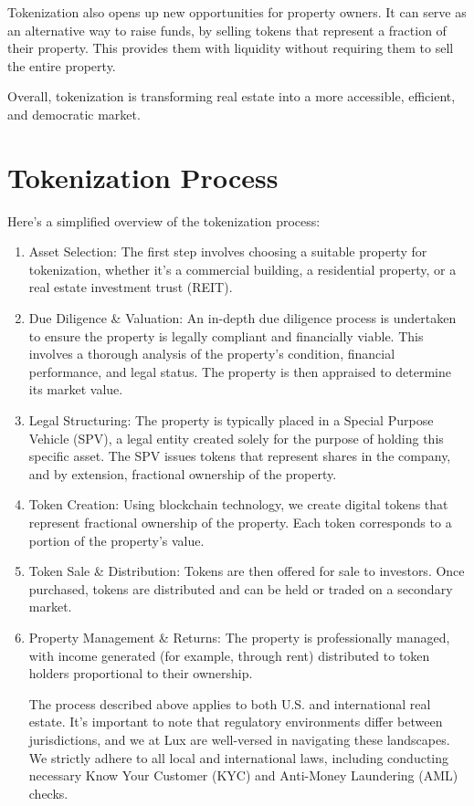 \documentclass[11pt]{article}
\begin{document}
Tokenization also opens up new opportunities for property owners. It can serve as an alternative way to raise funds, by selling tokens that represent a fraction of their property. This provides them with liquidity without requiring them to sell the entire property.


Overall, tokenization is transforming real estate into a more accessible, efficient, and democratic market.


\section{Tokenization Process}

Here's a simplified overview of the tokenization process:

\begin{enumerate}
  \item Asset Selection: The first step involves choosing a suitable property for tokenization, whether it's a commercial building, a residential property, or a real estate investment trust (REIT).
  \item Due Diligence \& Valuation: An in-depth due diligence process is undertaken to ensure the property is legally compliant and financially viable. This involves a thorough analysis of the property's condition, financial performance, and legal status. The property is then appraised to determine its market value.
  \item Legal Structuring: The property is typically placed in a Special Purpose Vehicle (SPV), a legal entity created solely for the purpose of holding this specific asset. The SPV issues tokens that represent shares in the company, and by extension, fractional ownership of the property.
  \item Token Creation: Using blockchain technology, we create digital tokens that represent fractional ownership of the property. Each token corresponds to a portion of the property's value.
  \item Token Sale \& Distribution: Tokens are then offered for sale to investors. Once purchased, tokens are distributed and can be held or traded on a secondary market.
  \item Property Management \& Returns: The property is professionally managed, with income generated (for example, through rent) distributed to token holders proportional to their ownership.

The process described above applies to both U.S. and international real estate. It's important to note that regulatory environments differ between jurisdictions, and we at Lux are well-versed in navigating these landscapes. We strictly adhere to all local and international laws, including conducting necessary Know Your Customer (KYC) and Anti-Money Laundering (AML) checks.

\end{enumerate}
\end{document}
